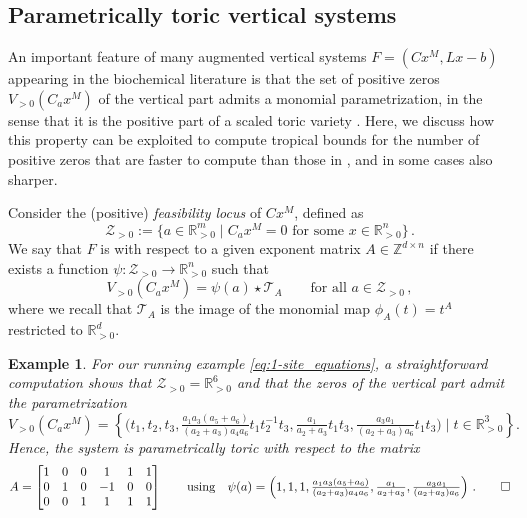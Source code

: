 \documentclass[11pt,reqno,a4paper]{amsart}
\numberwithin{equation}{section}
\theoremstyle{theoremstyle}
\theoremstyle{examplestyle}
\newtheorem{example}[theorem]{Example}
\newcommand{\RR}{\mathbb{R}}
\newcommand{\ZZ}{\mathbb{Z}}
\newcommand{\term}{\bfemph}
\begin{document}
\subsection{Parametrically toric vertical systems}
\label{subsec:parametric_toricity}

An important feature of many augmented vertical systems $F=(Cx^M, Lx-b)$ appearing in the biochemical literature is that the set of positive zeros $V_{>0}(C_ax^M)$ of the vertical part admits a monomial parametrization, in the sense that it is the positive part of a scaled toric variety \cite{FeliuHenriksson2024}. Here, we discuss how this property can be exploited to compute tropical bounds for the number of positive zeros that are faster to compute than those in , and in some cases also sharper.

Consider the (positive) \emph{feasibility locus} of $Cx^M$, defined as
\[\mathcal{Z}_{>0}:=\{a\in \RR^m_{>0}\mid \text{$C_a  x^M=0$ for some $x\in\RR^n_{>0}$}\}\,.\]
We say that $F$ is
\term{parametrically toric} with respect to a given exponent matrix $A\in\ZZ^{d\times n}$ if there exists a function  $\psi\colon\mathcal{Z}_{>0}\to \RR^n_{>0}$
such that
\begin{equation}\label{eq:psi}
    V_{>0}(C_a x^M) =\psi(a)\star\mathcal{T}_A\qquad\text{for all $a\in\mathcal{Z}_{>0}$}\, ,
    \end{equation}
where we recall that $\mathcal{T}_A$ is the image of the monomial map $\phi_A(t)=t^A$ restricted to $\RR^d_{>0}$. 

\begin{example}
\label{ex:running_example_is_toric}
For our running example \eqref{eq:1-site_equations}, a straightforward computation shows that $\mathcal{Z}_{>0}=\RR^6_{>0}$ and that the zeros of the vertical part admit the parametrization
$$V_{>0}(C_ax^M)=\left\{\big(t_1,t_2,t_3,\tfrac{a_{1} a_{3}(a_{5}+a_{6})}{(a_{2}+a_{3})a_{4}a_{6}} t_1t_2^{-1}t_3, \tfrac{a_{1}}{a_{2}+a_{3}} t_1t_3, 
\tfrac{a_{3} a_{1}}{(a_{2}+a_{3})a_{6}} t_1t_3
\big)\mid t\in\RR^3_{>0}\right\}.$$
Hence, the system is parametrically toric with respect to the matrix
\[A=\begin{bmatrix}1 & 0 & 0 & 1 & 1 & 1\\
0 & 1 & 0 & -1 & 0 & 0\\
0 & 0 & 1 & 1 & 1 & 1\end{bmatrix}\qquad \text{using} \quad \psi(a)=\left(1,1,1,\tfrac{a_{1} a_{3}(a_{5}+a_{6})}{(a_{2}+a_{3}) a_{4}a_{6} }, \tfrac{a_{1}}{a_{2}+a_{3}}, 
\tfrac{a_{3} a_{1}}{(a_{2}+a_{3})a_{6}} \right)\,.\qedhere\]
\end{example}
\end{document}
